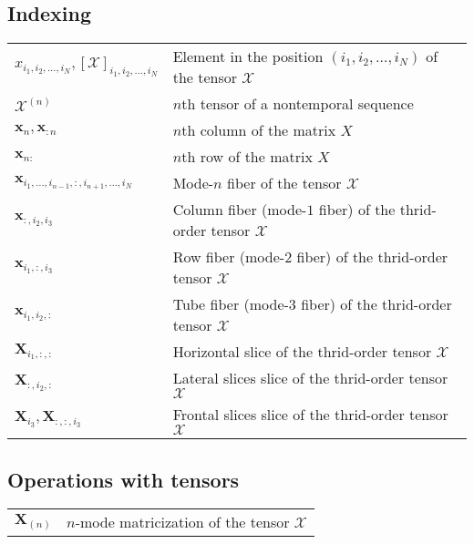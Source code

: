 \documentclass{article}
\begin{document}
\subsection{Indexing}
\begin{xltabular}[l]{\linewidth}{XX}
    \(x_{i_1,i_2, \dots, i_N}, \left[ \bm{\mathcal{X}} \right]_{i_1,i_2, \dots, i_N}\) & Element in the position \((i_1,i_2, \dots, i_N)\) of the tensor \(\bm{\mathcal{X}}\)\\
    \(\bm{\mathcal{X}}^{(n)}\) & \(n\)th tensor of a nontemporal sequence\\
    \(\mathbf{x}_{n}, \mathbf{x}_{:n}\) & \(n\)th column of the matrix \(X\)\\
    \(\mathbf{x}_{n:}\) & \(n\)th row of the matrix \(X\)\\
    \(\mathbf{x}_{i_1,\dots,i_{n-1}, :, i_{n+1},\dots, i_N}\) & Mode-\(n\) fiber of the tensor \(\bm{\mathcal{X}}\)\\
    \(\mathbf{x}_{:,i_2,i_3}\) & Column fiber (mode-\(1\) fiber) of the thrid-order tensor \(\bm{\mathcal{X}}\)\\
    \(\mathbf{x}_{i_1,:,i_3}\) & Row fiber (mode-\(2\) fiber) of the thrid-order tensor \(\bm{\mathcal{X}}\)\\
    \(\mathbf{x}_{i_1,i_2,:}\) & Tube fiber (mode-\(3\) fiber) of the thrid-order tensor \(\bm{\mathcal{X}}\)\\
    \(\mathbf{X}_{i_1,:,:}\) & Horizontal slice of the thrid-order tensor \(\bm{\mathcal{X}}\)\\
    \(\mathbf{X}_{:,i_2,:}\) & Lateral slices slice of the thrid-order tensor \(\bm{\mathcal{X}}\)\\
    \(\mathbf{X}_{i_3}, \mathbf{X}_{:,:,i_3}\) & Frontal slices slice of the thrid-order tensor \(\bm{\mathcal{X}}\)
\end{xltabular}

\subsection{Operations with tensors}
\begin{xltabular}{\textwidth}{XX}
\(\mathbf{X}_{(n)}\) & \(n\)-mode matricization of the tensor \(\bm{\mathcal{X}}\)\\
\end{xltabular}
\end{document}

